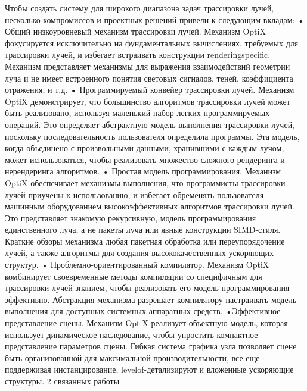 Чтобы создать систему для широкого диапазона задач трассировки лучей, несколько компромиссов и проектных решений привели к следующим вкладам:
• Общий низкоуровневый механизм трассировки лучей. Механизм OptiX фокусируется исключительно на фундаментальных вычислениях, требуемых для трассировки лучей, и избегает встраивать конструкции renderingspecific. Механизм представляет механизмы для выражения взаимодействий геометрии луча и не имеет встроенного понятия световых сигналов, теней, коэффициента отражения, и т.д.
• Программируемый конвейер трассировки лучей. Механизм OptiX демонстрирует, что большинство алгоритмов трассировки лучей может быть реализовано, используя маленький набор легких программируемых операций. Это определяет абстрактную модель выполнения трассировки лучей, поскольку последовательность пользователя определила программы. Эта модель, когда объединено с произвольными данными, хранившими с каждым лучом, может использоваться, чтобы реализовать множество сложного рендеринга и нерендеринга алгоритмов.
• Простая модель программирования. Механизм OptiX обеспечивает механизмы выполнения, что программисты трассировки лучей приучены к использованию, и избегает обременять пользователя машинным оборудованием высокоэффективных алгоритмов трассировки лучей. Это представляет знакомую рекурсивную, модель программирования единственного луча, а не пакеты луча или явные конструкции SIMD-стиля. Краткие обзоры механизма любая пакетная обработка или переупорядочение лучей, а также алгоритмы для создания высококачественных ускоряющих структур.
• Проблемно-ориентированный компилятор. Механизм OptiX комбинирует своевременные методы компиляции со специфичным для трассировки лучей знанием, чтобы реализовать его модель программирования эффективно. Абстракция механизма разрешает компилятору настраивать модель выполнения для доступных системных аппаратных средств.
•Эффективное представление сцены. Механизм OptiX реализует объектную модель, которая использует динамическое наследование, чтобы упростить компактное представление параметров сцены. Гибкая система графика узла позволяет сцене быть организованной для максимальной производительности, все еще поддерживая инстанцирование, levelof-детализируют и вложенные ускоряющие структуры.
2 связанных работы

